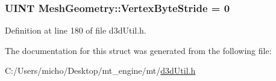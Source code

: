 \subsubsection[{\texorpdfstring{Vertex\+Byte\+Stride}{VertexByteStride}}]{\setlength{\rightskip}{0pt plus 5cm}U\+I\+NT Mesh\+Geometry\+::\+Vertex\+Byte\+Stride = 0}\hypertarget{struct_mesh_geometry_a809bd47a42dcf1f8512c55c663354fe9_a809bd47a42dcf1f8512c55c663354fe9}{}\label{struct_mesh_geometry_a809bd47a42dcf1f8512c55c663354fe9_a809bd47a42dcf1f8512c55c663354fe9}


Definition at line 180 of file d3d\+Util.\+h.



The documentation for this struct was generated from the following file\+:\begin{DoxyCompactItemize}
\item 
C\+:/\+Users/micho/\+Desktop/mt\+\_\+engine/mt/\hyperlink{d3d_util_8h}{d3d\+Util.\+h}\end{DoxyCompactItemize}
